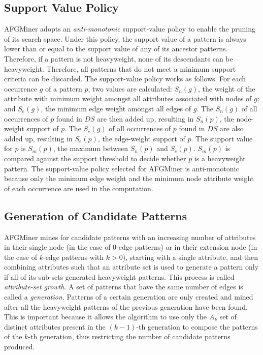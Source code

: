 \subsection{Support Value Policy}
AFGMiner adopts an \emph{anti-monotonic} support-value policy to enable the pruning of its search space. Under this policy, the support value of a pattern is always lower than or equal to the support value of any of its ancestor patterns. Therefore, if a pattern is not heavyweight, none of its descendants can be heavyweight. Therefore, all patterns that do not meet a minimum support criteria can be discarded. The support-value policy works as follows. For each occurrence $g$ of a pattern $p$, two values are calculated: $S_n(g)$, the weight of the attribute with minimum weight amongst all attributes associated with nodes of $g$; and $S_e(g)$, the minimum edge weight amongst all edges of $g$. The $S_n(g)$ of all occurrences of $p$ found in $DS$ are then added up, resulting in $S_n(p)$, the node-weight support of $p$. The $S_e(g)$ of all occurrences of $p$ found in $DS$ are also added up, resulting in $S_e(p)$, the edge-weight support of $p$. The support value for $p$ is $S_m(p)$, the maximum between $S_n(p)$ and $S_e(p)$. $S_m(p)$ is compared against the support threshold to decide whether $p$ is a heavyweight pattern. The support-value policy selected for AFGMiner is anti-monotonic because only the minimum edge weight and the minimum node attribute weight of each occurrence are used in the computation.

\subsection{Generation of Candidate Patterns}
AFGMiner mines for candidate patterns with an increasing number of attributes in their single node (in the case of 0-edge patterns) or in their extension node (in the case of $k$-edge patterns with $k > 0$), starting with a single attribute, and then combining attributes such that an attribute set is used to generate a pattern only if all of its sub-sets generated heavyweight patterns. This process is called \emph{attribute-set growth}. A set of patterns that have the same number of edges is called a \emph{generation}. Patterns of a certain generation are only created and mined after all the heavyweight patterns of the previous generation have been found. This is important because it allows the algorithm to use only the $A_k$ set of distinct attributes present in the $(k - 1)$-th generation to compose the patterns of the $k$-th generation, thus restricting the number of candidate patterns produced.

